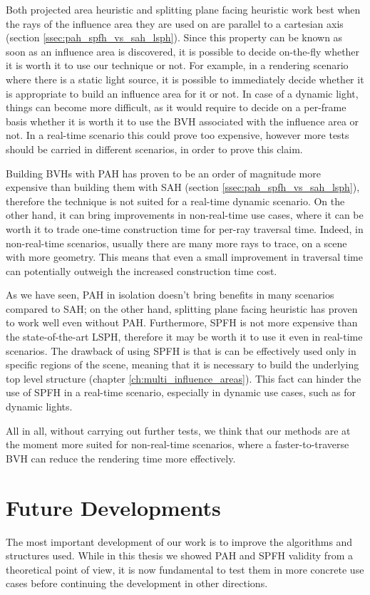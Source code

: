 \documentclass{PoliMi_MasterThesis}
\begin{document}
Both projected area heuristic and splitting plane facing heuristic work best when the rays of the influence area they are used on are parallel to a cartesian axis (section \ref{ssec:pah_spfh_vs_sah_lsph}). Since this property can be known as soon as an influence area is discovered, it is possible to decide on-the-fly whether it is worth it to use our technique or not. For example, in a rendering scenario where there is a static light source, it is possible to immediately decide whether it is appropriate to build an influence area for it or not. In case of a dynamic light, things can become more difficult, as it would require to decide on a per-frame basis whether it is worth it to use the BVH associated with the influence area or not. In a real-time scenario this could prove too expensive, however more tests should be carried in different scenarios, in order to prove this claim.

Building BVHs with PAH has proven to be an order of magnitude more expensive than building them with SAH (section \ref{ssec:pah_spfh_vs_sah_lsph}), therefore the technique is not suited for a real-time dynamic scenario. On the other hand, it can bring improvements in non-real-time use cases, where it can be worth it to trade one-time construction time for per-ray traversal time. Indeed, in non-real-time scenarios, usually there are many more rays to trace, on a scene with more geometry. This means that even a small improvement in traversal time can potentially outweigh the increased construction time cost.

As we have seen, PAH in isolation doesn't bring benefits in many scenarios compared to SAH; on the other hand, splitting plane facing heuristic has proven to work well even without PAH. Furthermore, SPFH is not more expensive than the state-of-the-art LSPH, therefore it may be worth it to use it even in real-time scenarios. The drawback of using SPFH is that is can be effectively used only in specific regions of the scene, meaning that it is necessary to build the underlying top level structure (chapter \ref{ch:multi_influence_areas}). This fact can hinder the use of SPFH in a real-time scenario, especially in dynamic use cases, such as for dynamic lights.

All in all, without carrying out further tests, we think that our methods are at the moment more suited for non-real-time scenarios, where a faster-to-traverse BVH can reduce the rendering time more effectively.

\section{Future Developments} \label{sec:future_developments}
The most important development of our work is to improve the algorithms and structures used. While in this thesis we showed PAH and SPFH validity from a theoretical point of view, it is now fundamental to test them in more concrete use cases before continuing the development in other directions.
\end{document}
